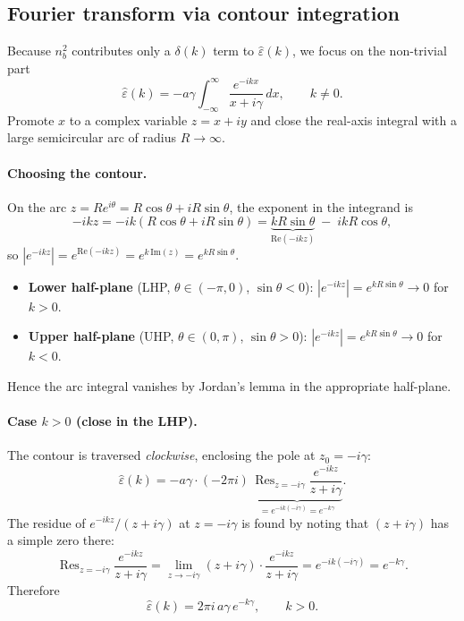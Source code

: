 \documentclass[11pt]{article}
\newcommand{\gam}{\gamma}
\newcommand{\epsh}{\hat{\varepsilon}}
\DeclareMathOperator{\Res}{Res}
\begin{document}
\subsection{Fourier transform via contour integration}

Because $n_b^2$ contributes only a $\delta(k)$ term to $\epsh(k)$, we focus on
the non-trivial part
\begin{equation}
    \epsh(k) = -a\gam \int_{-\infty}^{\infty}
        \frac{e^{-ikx}}{x + i\gam}\, dx, \qquad k \neq 0.
\end{equation}
Promote $x$ to a complex variable $z = x + iy$ and close the real-axis
integral with a large semicircular arc of radius $R \to \infty$.

\paragraph{Choosing the contour.}
On the arc $z = Re^{i\theta} = R\cos\theta + iR\sin\theta$, the exponent in
the integrand is
\begin{equation}
    -ikz = -ik(R\cos\theta + iR\sin\theta)
         = \underbrace{kR\sin\theta}_{\mathrm{Re}(-ikz)} \;-\; ikR\cos\theta,
\end{equation}
so $\left|e^{-ikz}\right| = e^{\mathrm{Re}(-ikz)} = e^{k\,\mathrm{Im}(z)} = e^{kR\sin\theta}$.
\begin{itemize}
    \item \textbf{Lower half-plane} (LHP, $\theta\in(-\pi,0)$, $\sin\theta < 0$):
          $|e^{-ikz}| = e^{kR\sin\theta} \to 0$ for $k > 0$.
    \item \textbf{Upper half-plane} (UHP, $\theta\in(0,\pi)$, $\sin\theta > 0$):
          $|e^{-ikz}| = e^{kR\sin\theta} \to 0$ for $k < 0$.
\end{itemize}
Hence the arc integral vanishes by Jordan's lemma in the appropriate half-plane.

\paragraph{Case $k > 0$ (close in the LHP).}
The contour is traversed \emph{clockwise}, enclosing the pole at $z_0 = -i\gam$:
\begin{equation}
    \epsh(k) = -a\gam \cdot (-2\pi i)\,
        \underbrace{\Res_{z=-i\gam}\!\frac{e^{-ikz}}{z+i\gam}}_{\displaystyle= e^{-ik(-i\gam)} = e^{-k\gam}}.
\end{equation}
The residue of $e^{-ikz}/(z+i\gam)$ at $z=-i\gam$ is found by noting that
$(z+i\gam)$ has a simple zero there:
\begin{equation}
    \Res_{z=-i\gam}\frac{e^{-ikz}}{z+i\gam}
    = \lim_{z\to -i\gam}(z+i\gam)\cdot\frac{e^{-ikz}}{z+i\gam}
    = e^{-ik(-i\gam)} = e^{-k\gam}.
\end{equation}
Therefore
\begin{equation}\label{eq:lor_epsh_pos}
    \boxed{\epsh(k) = 2\pi i\, a\gam\, e^{-k\gam}, \qquad k > 0.}
\end{equation}
\end{document}
